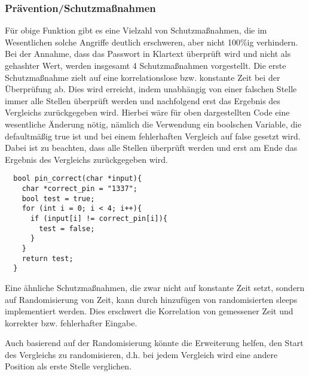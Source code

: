 \documentclass[a4paper,
DIV=13,
12pt,
BCOR=10mm,
department=FakIM,
oneside,
parskip=half,
automark,
listof=totocnumbered,
bibliography=totocnumbered,
acronym=totocnumbered
] {OTHRartcl}
\begin{document}
\subsubsection{Prävention/Schutzmaßnahmen}
Für obige Funktion gibt es eine Vielzahl von Schutzmaßnahmen, die im Wesentlichen solche Angriffe deutlich erschweren, aber nicht 100\%ig verhindern.
Bei der Annahme, dass das Passwort in Klartext überprüft wird und nicht als gehashter Wert, werden insgesamt 4 Schutzmaßnahmen vorgestellt.
Die erste Schutzmaßnahme zielt auf eine korrelationslose bzw. konstante Zeit bei der Überprüfung ab. Dies wird erreicht, indem unabhängig
von einer falschen Stelle immer alle Stellen überprüft werden und nachfolgend erst das Ergebnis des Vergleichs zurückgegeben wird.
Hierbei wäre für oben dargestellten Code eine wesentliche Änderung nötig, nämlich die Verwendung ein boolschen Variable,
die defaultmäßig true ist und bei einem fehlerhaften Vergleich auf false gesetzt wird. Dabei ist zu beachten, dass
alle Stellen überprüft werden und erst am Ende das Ergebnis des Vergleichs zurückgegeben wird.
\begin{verbatim}
  bool pin_correct(char *input){
    char *correct_pin = "1337";
    bool test = true;
    for (int i = 0; i < 4; i++){
      if (input[i] != correct_pin[i]){
        test = false;
      }
    }
    return test;
  }
\end{verbatim}

Eine ähnliche Schutzmaßnahmen, die zwar nicht auf konstante Zeit setzt, sondern auf Randomisierung von Zeit, kann durch hinzufügen von
randomisierten sleeps implementiert werden. Dies erschwert die Korrelation von gemessener Zeit und korrekter bzw. fehlerhafter Eingabe.

Auch basierend auf der Randomisierung könnte die Erweiterung helfen, den Start des Vergleichs zu randomisieren, d.h. bei jedem Vergleich
wird eine andere Position als erste Stelle verglichen.


\end{document}
